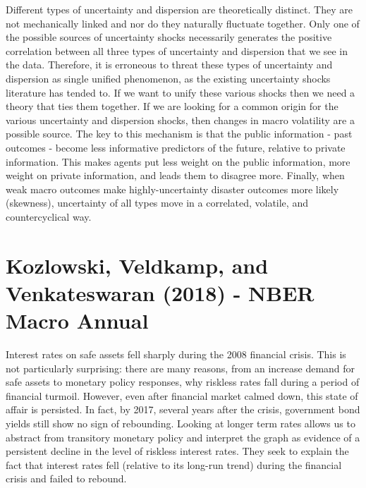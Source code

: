 \documentclass{article}
\begin{document}
{Different types of uncertainty and dispersion are theoretically distinct. They are not mechanically linked and nor do they naturally fluctuate together. Only one of the possible sources of uncertainty shocks necessarily generates the positive correlation between all three types of uncertainty and dispersion that we see in the data. Therefore, it is erroneous to threat these types of uncertainty and dispersion as single unified phenomenon, as the existing uncertainty shocks literature has tended to. If we want to unify these various shocks then we need a theory that ties them together. If we are looking for a common origin for the various uncertainty and dispersion shocks, then changes in macro volatility are a possible source. The key to this mechanism is that the public information - past outcomes - become less informative predictors of the future, relative to private information. This makes agents put less weight on the public information, more weight on private information, and leads them to disagree more.  Finally, when weak macro outcomes make highly-uncertainty disaster outcomes more likely (skewness), uncertainty of all types move in a correlated, volatile, and countercyclical way.

\section{Kozlowski, Veldkamp, and Venkateswaran (2018) - NBER Macro Annual}

Interest rates on safe assets fell sharply during the 2008 financial crisis. This is not particularly surprising: there are many reasons, from an increase demand for safe assets to monetary policy responses, why riskless rates fall during a period of financial turmoil. However, even after financial market calmed down, this state of affair is persisted. In fact, by 2017, several years after the crisis, government bond yields still show no sign of rebounding. Looking at longer term rates allows us to abstract from transitory monetary policy and interpret the graph as evidence of a persistent decline in the level of riskless interest rates. They seek to explain the fact that interest rates fell (relative to its long-run trend) during the financial crisis and failed to rebound. 

}
\end{document}
